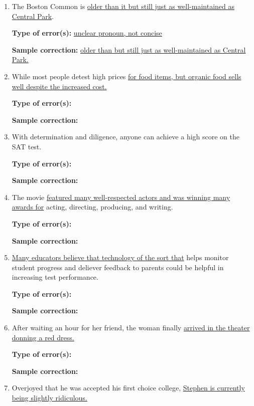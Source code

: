 \begin{spacing}{1.5}
\begin{enumerate}
\item The Boston Common is \ul{ older than it but still just as well-maintained as Central Park}.

\bigskip
\textbf{Type of error(s):} \ul{unclear pronoun, not concise}

\textbf{Sample correction:} \ul{older than but still just as well-maintained as Central Park.}

\bigskip
\item While most people detest high prices \ul{for food items, but organic food sells well despite the increased cost.}

\bigskip
\textbf{Type of error(s):} \hrulefill

\textbf{Sample correction:} \hrulefill

\item With determination and diligence, anyone can achieve a high score on the SAT test. 

\bigskip
\textbf{Type of error(s):} \hrulefill

\textbf{Sample correction:} \hrulefill

\bigskip
\item The movie \ul{featured many well-respected actors and was winning many awards for} acting, directing, producing, and writing.

\bigskip
\textbf{Type of error(s):} \hrulefill

\textbf{Sample correction:} \hrulefill

\bigskip
\item \ul{Many educators believe that technology of the sort that} helps monitor student progress and deliever feedback to parents could be helpful in increasing test performance. 

\bigskip
\textbf{Type of error(s):} \hrulefill

\textbf{Sample correction:} \hrulefill

\item After waiting an hour for her friend, the woman finally \ul{arrived in the theater donning a red dress.}

\bigskip
\textbf{Type of error(s):} \hrulefill

\textbf{Sample correction:} \hrulefill

\item Overjoyed that he was accepted his first choice college, \ul{Stephen is currently being slightly ridiculous.}


\end{enumerate}
\end{spacing}
